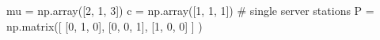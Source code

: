 
mu = np.array([2, 1, 3])
c = np.array([1, 1, 1]) # single server stations
P = np.matrix([
    [0, 1, 0],
    [0, 0, 1],
    [1, 0, 0]
]
)


